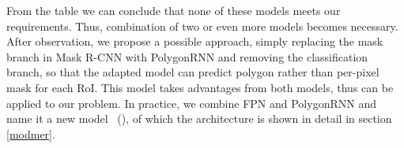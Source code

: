 From the table we can conclude that none of these models meets our requirements. Thus, combination of two or even more models becomes necessary. After observation, we propose a possible approach, simply replacing the mask branch in Mask R-CNN with PolygonRNN and removing the classification branch, so that the adapted model can predict polygon rather than per-pixel mask for each RoI. This model takes advantages from both models, thus can be applied to our problem. In practice, we combine FPN and PolygonRNN and name it a new model \modelnameshort\ (\modelnamelong), of which the architecture is shown in detail in section \ref{modmer}.

